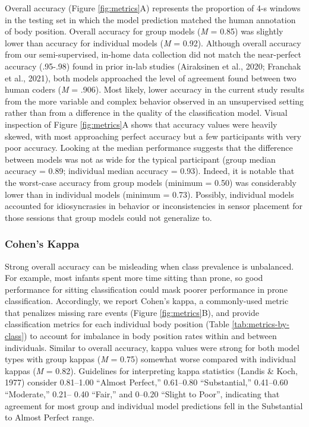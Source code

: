 \documentclass[
  man]{apa6}
\begin{document}
Overall accuracy (Figure \ref{fig:metrics}A) represents the proportion of 4-s windows in the testing set in which the model prediction matched the human annotation of body position. Overall accuracy for group models (\emph{M} = 0.85) was slightly lower than accuracy for individual models (\emph{M} = 0.92). Although overall accuracy from our semi-supervised, in-home data collection did not match the near-perfect accuracy (.95-.98) found in prior in-lab studies (Airaksinen et al., 2020; Franchak et al., 2021), both models approached the level of agreement found between two human coders (\emph{M} = .906). Most likely, lower accuracy in the current study results from the more variable and complex behavior observed in an unsupervised setting rather than from a difference in the quality of the classification model. Visual inspection of Figure \ref{fig:metrics}A shows that accuracy values were heavily skewed, with most approaching perfect accuracy but a few participants with very poor accuracy. Looking at the median performance suggests that the difference between models was not as wide for the typical participant (group median accuracy = 0.89; individual median accuracy = 0.93). Indeed, it is notable that the worst-case accuracy from group models (minimum = 0.50) was considerably lower than in individual models (minimum = 0.73). Possibly, individual models accounted for idiosyncrasies in behavior or inconsistencies in sensor placement for those sessions that group models could not generalize to.

\hypertarget{cohens-kappa}{%
\subsubsection{Cohen's Kappa}\label{cohens-kappa}}

Strong overall accuracy can be misleading when class prevalence is unbalanced. For example, most infants spent more time sitting than prone, so good performance for sitting classification could mask poorer performance in prone classification. Accordingly, we report Cohen's kappa, a commonly-used metric that penalizes missing rare events (Figure \ref{fig:metrics}B), and provide classification metrics for each individual body position (Table \ref{tab:metrics-by-class}) to account for imbalance in body position rates within and between individuals. Similar to overall accuracy, kappa values were strong for both model types with group kappas (\emph{M} = 0.75) somewhat worse compared with individual kappas (\emph{M} = 0.82). Guidelines for interpreting kappa statistics (Landis \& Koch, 1977) consider 0.81--1.00 ``Almost Perfect,'' 0.61--0.80 ``Substantial,'' 0.41--0.60 ``Moderate,'' 0.21-- 0.40 ``Fair,'' and 0--0.20 ``Slight to Poor'', indicating that agreement for most group and individual model predictions fell in the Substantial to Almost Perfect range.
\end{document}
